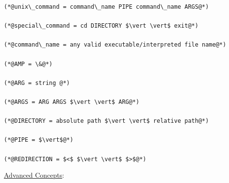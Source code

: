 \documentclass[12pt]{extarticle}
\newenvironment{myindentpar}[1]%
 {\begin{list}{}%
         {\setlength{\leftmargin}{#1}}%
         \item[]%
 }
 {\end{list}}
\begin{document}
\begin{myindentpar}{5mm}
\begin{lstlisting}[frame=single]
(*@unix\_command = command\_name PIPE command\_name ARGS@*)

(*@special\_command = cd DIRECTORY $\vert \vert$ exit@*)

(*@command\_name = any valid executable/interpreted file name@*)

(*@AMP = \&@*)

(*@ARG = string @*)

(*@ARGS = ARG ARGS $\vert \vert$ ARG@*)

(*@DIRECTORY = absolute path $\vert \vert$ relative path@*)

(*@PIPE = $\vert$@*)

(*@REDIRECTION = $<$ $\vert \vert$ $>$@*)
\end{lstlisting}

\end{myindentpar}

\newpage
\noindent
{\large \underline{Advanced Concepts}:} 
\end{document}
